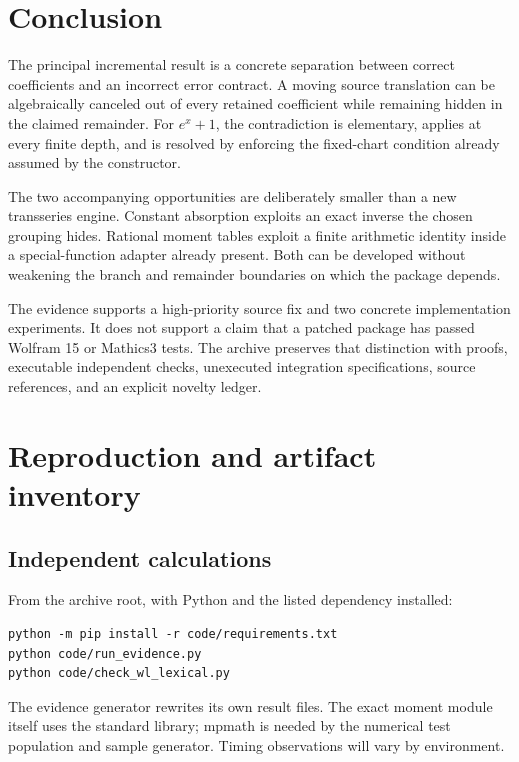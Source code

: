 \documentclass[11pt,letterpaper]{article}
\begin{document}
\section{Conclusion}
The principal incremental result is a concrete separation between correct coefficients and an incorrect error contract. A moving source translation can be algebraically canceled out of every retained coefficient while remaining hidden in the claimed remainder. For $e^x+1$, the contradiction is elementary, applies at every finite depth, and is resolved by enforcing the fixed-chart condition already assumed by the constructor.

The two accompanying opportunities are deliberately smaller than a new transseries engine. Constant absorption exploits an exact inverse the chosen grouping hides. Rational moment tables exploit a finite arithmetic identity inside a special-function adapter already present. Both can be developed without weakening the branch and remainder boundaries on which the package depends.

The evidence supports a high-priority source fix and two concrete implementation experiments. It does not support a claim that a patched package has passed Wolfram 15 or Mathics3 tests. The archive preserves that distinction with proofs, executable independent checks, unexecuted integration specifications, source references, and an explicit novelty ledger.

\appendix
\section{Reproduction and artifact inventory}
\subsection{Independent calculations}
From the archive root, with Python and the listed dependency installed:
\par\noindent\begin{minipage}{\linewidth}
\begin{lstlisting}
python -m pip install -r code/requirements.txt
python code/run_evidence.py
python code/check_wl_lexical.py
\end{lstlisting}
\end{minipage}\par
The evidence generator rewrites its own result files. The exact moment module itself uses the standard library; mpmath is needed by the numerical test population and sample generator. Timing observations will vary by environment.
\end{document}
